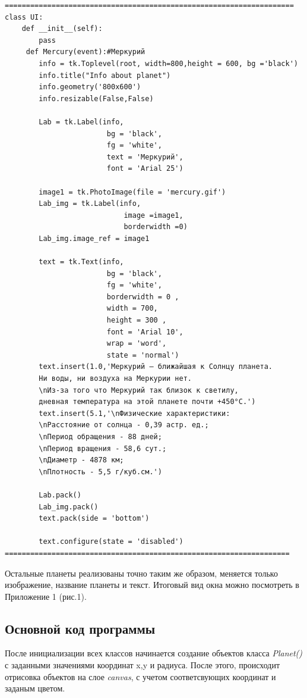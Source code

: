 \documentclass[11pt,a4paper]{report}
\begin{document}
\begin{verbatim}
====================================================================
class UI:
    def __init__(self):
        pass
     def Mercury(event):#Меркурий
        info = tk.Toplevel(root, width=800,height = 600, bg ='black')        
        info.title("Info about planet") 
        info.geometry('800x600')
        info.resizable(False,False) 
        
        Lab = tk.Label(info, 
                        bg = 'black',
                        fg = 'white',
                        text = 'Меркурий', 
                        font = 'Arial 25')
                        
        image1 = tk.PhotoImage(file = 'mercury.gif')
        Lab_img = tk.Label(info,
                            image =image1,
                            borderwidth =0)
        Lab_img.image_ref = image1
        
        text = tk.Text(info,
                        bg = 'black',
                        fg = 'white', 
                        borderwidth = 0 ,
                        width = 700, 
                        height = 300 , 
                        font = 'Arial 10', 
                        wrap = 'word', 
                        state = 'normal')
        text.insert(1.0,'Меркурий — ближайшая к Солнцу планета. 
        Ни воды, ни воздуха на Меркурии нет. 
        \nИз-за того что Меркурий так близок к светилу, 
        дневная температура на этой планете почти +450°С.')
        text.insert(5.1,'\nФизические характеристики:
        \nРасстояние от солнца - 0,39 астр. ед.;
        \nПериод обращения - 88 дней;
        \nПериод вращения - 58,6 сут.;
        \nДиаметр - 4878 км;
        \nПлотность - 5,5 г/куб.см.')
        
        Lab.pack()
        Lab_img.pack()
        text.pack(side = 'bottom')
        
        text.configure(state = 'disabled')
===================================================================
\end{verbatim}

Остальные планеты реализованы точно таким же образом, меняется только изображение, название планеты и текст.
Итоговый вид окна можно посмотреть в Приложение 1 (рис.1).
\subsection{Основной код программы}
После инициализации всех классов начинается создание объектов класса \textit{Planet()} с заданными значениями координат x,y и радиуса.
После этого, происходит отрисовка объектов на слое  \textit{canvas}, с  учетом соответсвующих координат и заданым цветом. 
\end{document}
